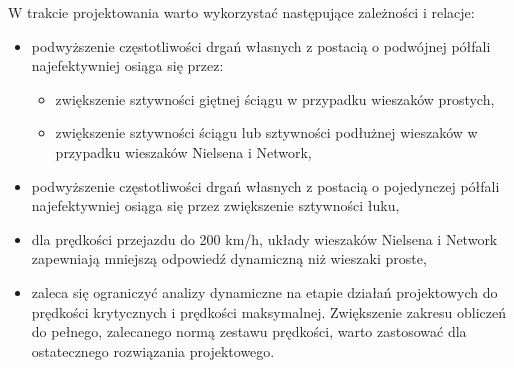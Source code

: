 \noindent
W trakcie projektowania warto wykorzystać następujące zależności i relacje:
\begin{itemize}
	\item podwyższenie częstotliwości drgań własnych z postacią o podwójnej półfali najefektywniej osiąga się przez: 
	\begin{itemize}
	\item zwiększenie sztywności giętnej ściągu w przypadku wieszaków prostych, 
	\item zwiększenie sztywności ściągu lub sztywności podłużnej wieszaków w przypadku wieszaków Nielsena i Network,
	\end{itemize}
	\item podwyższenie częstotliwości drgań własnych z postacią o pojedynczej półfali najefektywniej osiąga się przez zwiększenie sztywności łuku,
	\item dla prędkości przejazdu do 200 km/h, układy wieszaków Nielsena i Network zapewniają mniejszą odpowiedź dynamiczną niż wieszaki proste,
	\item zaleca się ograniczyć analizy dynamiczne na etapie działań projektowych do prędkości krytycznych i prędkości maksymalnej. Zwiększenie zakresu obliczeń do pełnego, zalecanego normą zestawu prędkości, warto zastosować dla ostatecznego rozwiązania projektowego.
\end{itemize}


